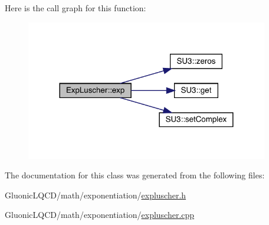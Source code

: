 Here is the call graph for this function\+:\nopagebreak
\begin{figure}[H]
\begin{center}
\leavevmode
\includegraphics[width=300pt]{class_exp_luscher_a8e4c0689c633728527e1220094c664c1_cgraph}
\end{center}
\end{figure}


The documentation for this class was generated from the following files\+:\begin{DoxyCompactItemize}
\item 
Gluonic\+L\+Q\+C\+D/math/exponentiation/\mbox{\hyperlink{expluscher_8h}{expluscher.\+h}}\item 
Gluonic\+L\+Q\+C\+D/math/exponentiation/\mbox{\hyperlink{expluscher_8cpp}{expluscher.\+cpp}}\end{DoxyCompactItemize}
